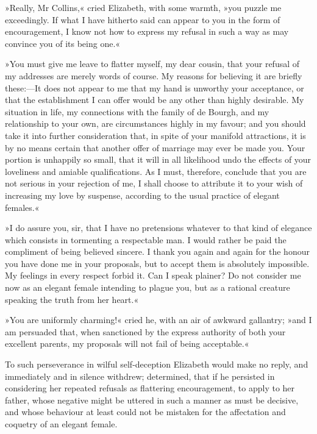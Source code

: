 »Really, Mr Collins,« cried Elizabeth, with some warmth, »you puzzle me exceedingly. If what I have hitherto said can appear to you in the form of encouragement, I know not how to express my refusal in such a way as may convince you of its being one.«

»You must give me leave to flatter myself, my dear cousin, that your refusal of my addresses are merely words of course. My reasons for believing it are briefly these:—It does not appear to me that my hand is unworthy your acceptance, or that the establishment I can offer would be any other than highly desirable. My situation in life, my connections with the family of de Bourgh, and my relationship to your own, are circumstances highly in my favour; and you should take it into further consideration that, in spite of your manifold attractions, it is by no means certain that another offer of marriage may ever be made you. Your portion is unhappily so small, that it will in all likelihood undo the effects of your loveliness and amiable qualifications. As I must, therefore, conclude that you are not serious in your rejection of me, I shall choose to attribute it to your wish of increasing my love by suspense, according to the usual practice of elegant females.«

»I do assure you, sir, that I have no pretensions whatever to that kind of elegance which consists in tormenting a respectable man. I would rather be paid the compliment of being believed sincere. I thank you again and again for the honour you have done me in your proposals, but to accept them is absolutely impossible. My feelings in every respect forbid it. Can I speak plainer? Do not consider me now as an elegant female intending to plague you, but as a rational creature speaking the truth from her heart.«

»You are uniformly charming!« cried he, with an air of awkward gallantry; »and I am persuaded that, when sanctioned by the express authority of both your excellent parents, my proposals will not fail of being acceptable.«

To such perseverance in wilful self-deception Elizabeth would make no reply, and immediately and in silence withdrew; determined, that if he persisted in considering her repeated refusals as flattering encouragement, to apply to her father, whose negative might be uttered in such a manner as must be decisive, and whose behaviour at least could not be mistaken for the affectation and coquetry of an elegant female.
